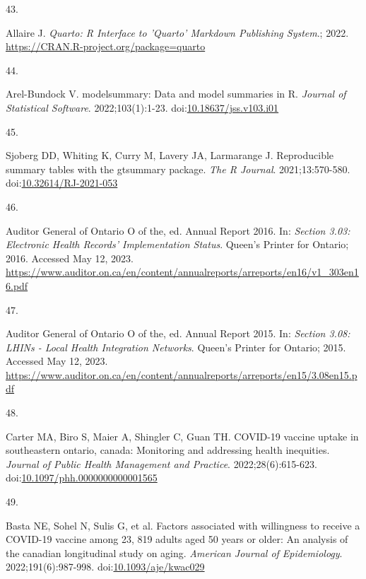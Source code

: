 \documentclass[
  letterpaper,
  DIV=11,
  numbers=noendperiod]{scrartcl}
\newlength{\cslhangindent}
\newlength{\csllabelwidth}
\newlength{\cslentryspacingunit} %
\newenvironment{CSLReferences}[2] %
 {%
  \setlength{\parindent}{0pt}
  \ifodd #1
  \let\oldpar\par
  \def\par{\hangindent=\cslhangindent\oldpar}
  \fi
  \setlength{\parskip}{#2\cslentryspacingunit}
 }%
 {}
\newcommand{\CSLLeftMargin}[1]{\parbox[t]{\csllabelwidth}{#1}}
\newcommand{\CSLRightInline}[1]{\parbox[t]{\linewidth - \csllabelwidth}{#1}\break}
\begin{document}
\begin{CSLReferences}{0}{0}
\leavevmode{}%
\CSLLeftMargin{43. }%
\CSLRightInline{Allaire J. \emph{Quarto: R Interface to 'Quarto'
Markdown Publishing System}.; 2022.
\url{https://CRAN.R-project.org/package=quarto}}

\leavevmode{}%
\CSLLeftMargin{44. }%
\CSLRightInline{Arel-Bundock V. {modelsummary}: Data and model summaries
in {R}. \emph{Journal of Statistical Software}. 2022;103(1):1-23.
doi:\href{https://doi.org/10.18637/jss.v103.i01}{10.18637/jss.v103.i01}}

\leavevmode{}%
\CSLLeftMargin{45. }%
\CSLRightInline{Sjoberg DD, Whiting K, Curry M, Lavery JA, Larmarange J.
Reproducible summary tables with the gtsummary package. \emph{{The R
Journal}}. 2021;13:570-580.
doi:\href{https://doi.org/10.32614/RJ-2021-053}{10.32614/RJ-2021-053}}

\leavevmode{}%
\CSLLeftMargin{46. }%
\CSLRightInline{Auditor General of Ontario O of the, ed. Annual {R}eport
2016. In: \emph{Section 3.03: Electronic Health Records' Implementation
Status}. Queen's Printer for Ontario; 2016. Accessed May 12, 2023.
\url{https://www.auditor.on.ca/en/content/annualreports/arreports/en16/v1_303en16.pdf}}

\leavevmode{}%
\CSLLeftMargin{47. }%
\CSLRightInline{Auditor General of Ontario O of the, ed. Annual {R}eport
2015. In: \emph{Section 3.08: LHINs - Local Health Integration
Networks}. Queen's Printer for Ontario; 2015. Accessed May 12, 2023.
\url{https://www.auditor.on.ca/en/content/annualreports/arreports/en15/3.08en15.pdf}}

\leavevmode{}%
\CSLLeftMargin{48. }%
\CSLRightInline{Carter MA, Biro S, Maier A, Shingler C, Guan TH.
{COVID}-19 vaccine uptake in southeastern ontario, canada: Monitoring
and addressing health inequities. \emph{Journal of Public Health
Management and Practice}. 2022;28(6):615-623.
doi:\href{https://doi.org/10.1097/phh.0000000000001565}{10.1097/phh.0000000000001565}}

\leavevmode{}%
\CSLLeftMargin{49. }%
\CSLRightInline{Basta NE, Sohel N, Sulis G, et al. Factors associated
with willingness to receive a {COVID}-19 vaccine among 23, 819 adults
aged 50 years or older: An analysis of the canadian longitudinal study
on aging. \emph{American Journal of Epidemiology}. 2022;191(6):987-998.
doi:\href{https://doi.org/10.1093/aje/kwac029}{10.1093/aje/kwac029}}


\end{CSLReferences}
\end{document}
